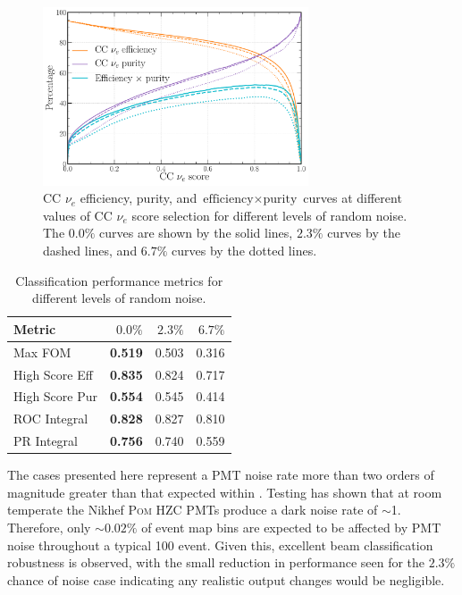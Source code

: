 \begin{figure} %
    \includegraphics[width=0.7\textwidth]{diagrams/7-results/calib_noise_nuel_eff_curves.pdf}
    \caption[CC $\nu_{e}$ efficiency and purity curves for different levels of random noise]
    {CC $\nu_{e}$ efficiency, purity, and $\text{efficiency}\times\text{purity}$ curves at
        different values of CC $\nu_{e}$ score selection for different levels of random noise. The
        $0.0\%$ curves are shown by the solid lines, $2.3\%$ curves by the dashed lines, and
        $6.7\%$ curves by the dotted lines.}
    \label{fig:calib_noise_nuel_eff_curves}
\end{figure}

\begin{table} %
    \begin{tabular}{lrrr}
        Metric         & $0.0\%$        & $2.3\%$ & $6.7\%$ \\
        \midrule
        Max FOM        & \textbf{0.519} & 0.503   & 0.316   \\
        High Score Eff & \textbf{0.835} & 0.824   & 0.717   \\
        High Score Pur & \textbf{0.554} & 0.545   & 0.414   \\
        ROC Integral   & \textbf{0.828} & 0.827   & 0.810   \\
        PR Integral    & \textbf{0.756} & 0.740   & 0.559   \\
    \end{tabular}
    \caption[Classification performance metrics for different levels of random noise]
    {Classification performance metrics for different levels of random noise.}
    \label{tab:calib_noise}
\end{table}

The cases presented here represent a PMT noise rate more than two orders of magnitude greater than
that expected within \chipsfive. Testing has shown that at room temperate the Nikhef \textsc{Pom}
HZC PMTs produce a dark noise rate of $\sim$\unit{1}{}. Therefore, only $\sim0.02\%$ of
event map bins are expected to be affected by PMT noise throughout a typical \unit{100}{}
event. Given this, excellent beam classification robustness is observed, with the small reduction
in performance seen for the $2.3\%$ chance of noise case indicating any realistic output changes
would be negligible.

